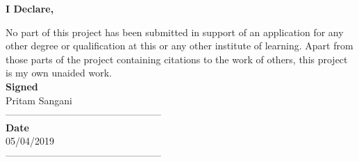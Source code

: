 %
%
\tocless{}
\vspace{6mm}
\begin{flushleft}
    \large \textbf{I Declare, }\\
\end{flushleft}
\begin{flushleft}
\vspace*{13mm}
No part of this project has
been submitted in support of
an application for any other
degree or qualification at this
or any other institute of learning.
Apart from those parts
of the project containing citations
to the work of others,
this project is my own unaided
work.\\
\vspace*{13mm}
\textbf{Signed}\\
\vspace*{7mm}
Pritam Sangani\\
------------------------------------------------\\
\vspace*{8mm}
\textbf{Date}\\
\vspace*{7mm}
05/04/2019\\
------------------------------------------------\\
\end{flushleft}
   